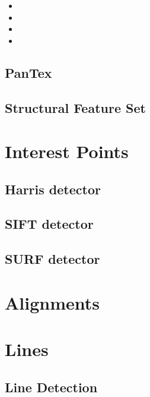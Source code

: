 \relatedClasses
\begin{itemize}
\item {}
\item {}
\item {}
\item {}
\end{itemize}



\subsection{PanTex}


\subsection{Structural Feature Set}


\section{Interest Points}
\subsection{Harris detector}

\subsection{SIFT detector}
\label{sec:SIFTDetector}
% 
\subsection{SURF detector}


\section{Alignments}
\label{sec:Alignments}

\section{Lines}
\label{sec:LineDetectors}

\subsection{Line Detection}
\label{sec:LineDetection}






